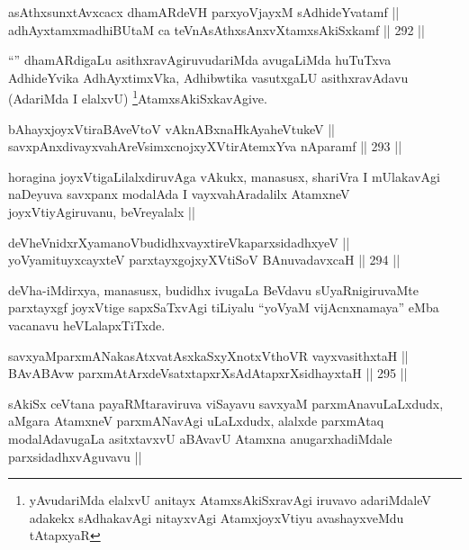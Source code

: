 \begin{shl}
asAthxsunxtAvxcacx dhamARdeVH parxyoVjayxM sAdhideYvatamf ||  \\
adhAyxtamxmadhiBUtaM ca teVnAsAthxsAnxvXtamxsAkiSxkamf ||  292 ||  
\end{shl}

\begin{artha}
``\stext'' dhamARdigaLu asithxravAgiruvudariMda avugaLiMda huTuTxva AdhideYvika AdhAyxtimxVka, Adhibwtika vasutxgaLU asithxravAdavu (AdariMda I elalxvU) \footnote{yAvudariMda elalxvU anitayx AtamxsAkiSxravAgi iruvavo adariMdaleV adakekx sAdhakavAgi nitayxvAgi AtamxjoyxVtiyu avashayxveMdu tAtapxyaR}AtamxsAkiSxkavAgive.
\end{artha}

\begin{shl}
bAhayxjoyxVtiraBAveV\s toV vAknABxnaHkAyaheVtukeV || \\
savxpAnxdivayxvahAreV\s simxcnojxyXVtirAtemxYva nAparamf ||  293 ||  
\end{shl}

\begin{artha}
horagina joyxVtigaLilalxdiruvAga vAkukx, manasusx, shariVra I mUlakavAgi naDeyuva savxpanx modalAda I vayxvahAradalilx AtamxneV joyxVtiyAgiruvanu, beVreyalalx ||
\end{artha}

\begin{shl}
deVheVnidxrXyamanoVbudidhxvayxtireVkaparxsidadhxyeV || \\
yoV\s yamituyxcayxteV parxtayxgojxyXVtiSoV BAnuvadavxcaH ||  294 ||  
\end{shl}

\begin{artha}
deVha-iMdirxya, manasusx, budidhx ivugaLa BeVdavu sUyaRnigiruvaMte parxtayxgf joyxVtige sapxSaTxvAgi tiLiyalu ``yoV\s yaM vijAcnxnamaya'' eMba vacanavu heVLalapxTiTxde.
\end{artha}

\begin{shl}
savxyaMparxmANakasAtxvatAsxkaSxyXnotxV\s thoVR vayxvasithxtaH || \\
BAvABAvw parxmAtArxdeVsatxtapxrXsAdAtapxrXsidhayxtaH ||  295 ||  
\end{shl}

\begin{artha}
sAkiSx ceVtana payaRMtaraviruva viSayavu savxyaM parxmAnavuLaLxdudx, aMgara AtamxneV parxmANavAgi uLaLxdudx, alalxde parxmAtaq modalAdavugaLa asitxtavxvU aBAvavU Atamxna anugarxhadiMdale parxsidadhxvAguvavu ||
\end{artha}


